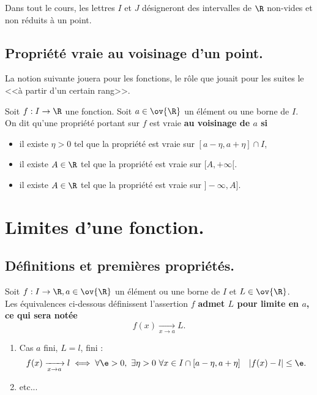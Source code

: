 \documentclass[11pt]{article}
\begin{document}
Dans tout le cours, les lettres $I$ et $J$ désigneront des intervalles de $\R$ non-vides et non réduits à un point.

\subsection{Propriété vraie au voisinage d'un point.}

La notion suivante jouera pour les fonctions, le rôle que jouait pour les suites le <<à partir d'un certain rang>>.

\begin{defi}{}{}
    Soit $f:I\to\R$ une fonction. Soit $a\in\ov{\R}$ un élément ou une borne de $I$.\\
    On dit qu'une propriété portant sur $f$ est vraie \bf{au voisinage de} $a$ si
    \begin{itemize}
        \item {} il existe $\eta>0$ tel que la propriété est vraie sur $[a-\eta,a+\eta]\cap I$,
        \item {} il existe $A\in\R$ tel que la propriété est vraie sur $[A,+\infty[$.
        \item {} il existe $A\in\R$ tel que la propriété est vraie sur $]-\infty,A]$.
    \end{itemize}
\end{defi}

\section{Limites d'une fonction.}

\subsection{Définitions et premières propriétés.}

\begin{defi}{}{}
    Soit $f:I\to \R, a \in \ov{\R}$ un élément ou une borne de $I$ et $L\in\ov{\R}$.\\
    Les équivalences ci-dessous définissent l'assertion $f$ \bf{admet} $L$ \bf{pour limite en} $a$, ce qui sera notée
    \begin{equation*}
        f(x)\xrightarrow[x\to a]{}L.
    \end{equation*}
    \begin{enumerate}
        \item Cas $a$ fini, $L=l$, fini :
        \begin{equation*}
            f(x)\xrightarrow[x\to a]{} l \iff \forall \e > 0, ~ \exists \eta > 0 ~ \forall x \in I \cap [a - \eta, a + \eta] \quad |f(x)-l|\leq\e.
        \end{equation*}
        \item etc...
    \end{enumerate}
\end{defi}
\end{document}
